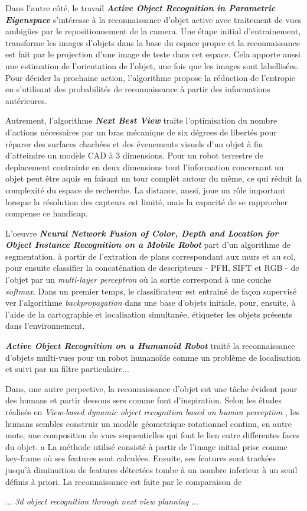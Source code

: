 	Dans l'autre côté, le travail \textbf{\textit{Active Object Recognition in Parametric Eigenspace}} s'intéresse à la reconnaissance d'objet active avec traitement de vues ambigües par le repositionnement de la camera. Une étape initial d'entrainement, transforme les images d'objets dans la base du espace propre et la reconnaissance est fait par le projection d'une image de teste dans cet espace. Cela apporte aussi une estimation de l'orientation de l'objet, une fois que les images sont labellisées. Pour décider la prochaine action, l'algorithme propose la réduction de l'entropie en s'utilisant des probabilités de reconnaissance à partir des informations antérieures.
	 
	Autrement, l'algorithme \textbf{\textit{Next Best View}} traite l'optimisation du nombre d'actions nécessaires par un bras mécanique de six dégrees de libertés pour réparer des surfaces chachées et des évenements visuels d'un objet à fin d'atteindre un modèle CAD à 3 dimensions. Pour un robot terrestre de deplacement contrainte en deux dimensions tout l'information concernant un objet peut être aquis en faisant un tour complèt autour du même, ce qui réduit la complexité du espace de recherche. La distance, aussi, joue un rôle important lorsque la résolution des capteurs est limité, mais la capacité de se rapprocher compense ce handicap.
	
	
	L'oeuvre \textbf{\textit{Neural Network Fusion of Color, Depth and Location for Object Instance Recognition on a Mobile Robot}} part d'un algorithme de segmentation, à partir de l'extration de plans correspondant aux murs et au sol, pour ensuite classifier la concaténation de descripteurs - PFH, SIFT et RGB - de l'objet par un \textit{multi-layer perceptron} où la sortie correspond à une couche \textit{softmax}. Dans un premier temps, le classificateur est entrainé de façon supervisé ver l'algorithme \textit{backpropagation} dans une base d'objets initiale, pour, ensuite, à l'aide de la cartographie et localisation simultanée, étiqueter les objets présents dans l'environnement. 

	{\color{green}	\textbf{\textit{Active Object Recognition on a Humanoid Robot}} traité la reconnaissance d'objets multi-vues pour un robot humanoïde comme un problème de localisation et suivi par un filtre particulaire... 

         Dans, une autre perpective, la reconnaissance d'objet est une tâche évident pour des humans et partir dessous sers comme font d'inspiration. Selon les études réalisés en \textit{ View-based dynamic object recognition based on human perception }, les humans sembles construir un modèle géometrique rotationnel continu, en autre mots, une composition de vues sequentielles qui font le lien entre differentes faces du objet. a La méthode utilisé consisté à partir de l'image initial prise comme key-frame où ses features sont calculées. Ensuite, ses features sont trackées jusqu'à diminuition de features détectées tombe à un nombre inferieur à un seuil définis à priori. La reconnaissance est faite par le comparaison de 

... \textit{3d object recognition through next view planning} ...
} 
	
